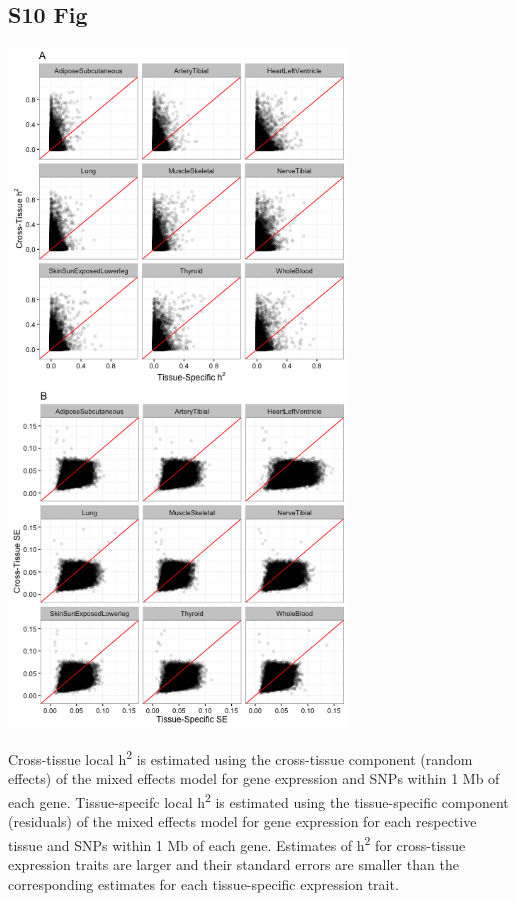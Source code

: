 \documentclass[10pt,letterpaper]{article}
\begin{document}
\begin{singlespace}
\subsection*{S10 Fig}
\includegraphics[width=9cm]{Figures/GenArch_Supp/S6Fig.png}
\label{S10_Fig}

 Cross-tissue local h\textsuperscript{2} is estimated using the cross-tissue component (random effects) of the mixed effects model for gene expression and SNPs within 1 Mb of each gene. Tissue-specifc local h\textsuperscript{2} is estimated using the tissue-specific component (residuals) of the mixed effects model for gene expression for each respective tissue and SNPs within 1 Mb of each gene. Estimates of h\textsuperscript{2} for cross-tissue expression traits are larger and their standard errors are smaller than the corresponding estimates for each tissue-specific expression trait.


\end{singlespace}
\end{document}
